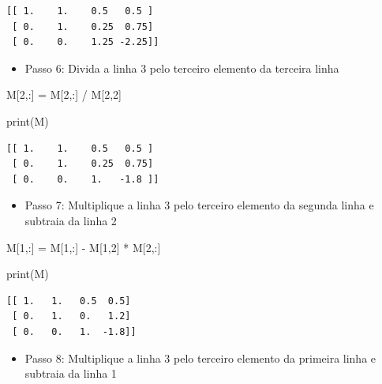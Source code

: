 \documentclass[
  brazilian,
  letterpaper,
  DIV=11,
  numbers=noendperiod]{scrreprt}
\newenvironment{Shaded}{\begin{snugshade}}{\end{snugshade}}
\newcommand{\BuiltInTok}[1]{\textcolor[rgb]{0.00,0.23,0.31}{#1}}
\newcommand{\DecValTok}[1]{\textcolor[rgb]{0.68,0.00,0.00}{#1}}
\newcommand{\NormalTok}[1]{\textcolor[rgb]{0.00,0.23,0.31}{#1}}
\newcommand{\OperatorTok}[1]{\textcolor[rgb]{0.37,0.37,0.37}{#1}}
\providecommand{\tightlist}{%
  \setlength{\itemsep}{0pt}\setlength{\parskip}{0pt}}
\begin{document}
\begin{verbatim}
[[ 1.    1.    0.5   0.5 ]
 [ 0.    1.    0.25  0.75]
 [ 0.    0.    1.25 -2.25]]
\end{verbatim}

\begin{itemize}
\tightlist
\item
  Passo 6: Divida a linha 3 pelo terceiro elemento da terceira linha
\end{itemize}

\begin{Shaded}
\begin{Highlighting}[]
\NormalTok{M[}\DecValTok{2}\NormalTok{,:] }\OperatorTok{=}\NormalTok{ M[}\DecValTok{2}\NormalTok{,:] }\OperatorTok{/}\NormalTok{ M[}\DecValTok{2}\NormalTok{,}\DecValTok{2}\NormalTok{]}

\BuiltInTok{print}\NormalTok{(M)}
\end{Highlighting}
\end{Shaded}

\begin{verbatim}
[[ 1.    1.    0.5   0.5 ]
 [ 0.    1.    0.25  0.75]
 [ 0.    0.    1.   -1.8 ]]
\end{verbatim}

\begin{itemize}
\tightlist
\item
  Passo 7: Multiplique a linha 3 pelo terceiro elemento da segunda linha
  e subtraia da linha 2
\end{itemize}

\begin{Shaded}
\begin{Highlighting}[]
\NormalTok{M[}\DecValTok{1}\NormalTok{,:] }\OperatorTok{=}\NormalTok{ M[}\DecValTok{1}\NormalTok{,:] }\OperatorTok{{-}}\NormalTok{ M[}\DecValTok{1}\NormalTok{,}\DecValTok{2}\NormalTok{] }\OperatorTok{*}\NormalTok{ M[}\DecValTok{2}\NormalTok{,:]}

\BuiltInTok{print}\NormalTok{(M)}
\end{Highlighting}
\end{Shaded}

\begin{verbatim}
[[ 1.   1.   0.5  0.5]
 [ 0.   1.   0.   1.2]
 [ 0.   0.   1.  -1.8]]
\end{verbatim}

\begin{itemize}
\tightlist
\item
  Passo 8: Multiplique a linha 3 pelo terceiro elemento da primeira
  linha e subtraia da linha 1
\end{itemize}
\end{document}
